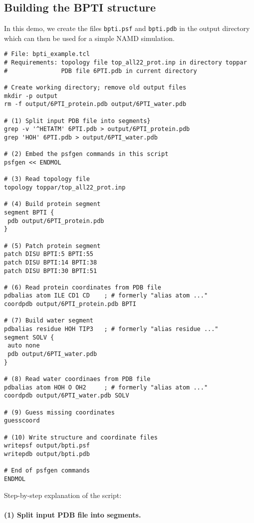 \subsection*{Building the BPTI structure}
In this demo, we create the files \verb#bpti.psf# and \verb#bpti.pdb#
in the output directory which can then be used for a simple NAMD
simulation.  

\begin{verbatim}
# File: bpti_example.tcl
# Requirements: topology file top_all22_prot.inp in directory toppar
#               PDB file 6PTI.pdb in current directory

# Create working directory; remove old output files
mkdir -p output
rm -f output/6PTI_protein.pdb output/6PTI_water.pdb

# (1) Split input PDB file into segments}
grep -v '^HETATM' 6PTI.pdb > output/6PTI_protein.pdb
grep 'HOH' 6PTI.pdb > output/6PTI_water.pdb

# (2) Embed the psfgen commands in this script
psfgen << ENDMOL

# (3) Read topology file
topology toppar/top_all22_prot.inp

# (4) Build protein segment
segment BPTI {
 pdb output/6PTI_protein.pdb
}

# (5) Patch protein segment
patch DISU BPTI:5 BPTI:55
patch DISU BPTI:14 BPTI:38
patch DISU BPTI:30 BPTI:51

# (6) Read protein coordinates from PDB file
pdbalias atom ILE CD1 CD    ; # formerly "alias atom ..."
coordpdb output/6PTI_protein.pdb BPTI

# (7) Build water segment
pdbalias residue HOH TIP3   ; # formerly "alias residue ..."
segment SOLV {
 auto none
 pdb output/6PTI_water.pdb
}

# (8) Read water coordinaes from PDB file
pdbalias atom HOH O OH2     ; # formerly "alias atom ..."
coordpdb output/6PTI_water.pdb SOLV

# (9) Guess missing coordinates
guesscoord

# (10) Write structure and coordinate files
writepsf output/bpti.psf
writepdb output/bpti.pdb

# End of psfgen commands
ENDMOL
\end{verbatim}

Step-by-step explanation of the script:

\paragraph*{(1) Split input PDB file into segments.}

